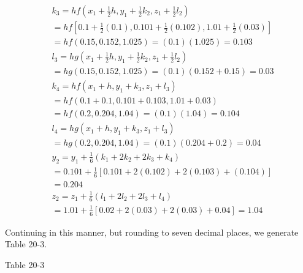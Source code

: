 \documentclass[10pt]{article}
\begin{document}
$$\begin{aligned}
& k_{3}=h f\left(x_{1}+\frac{1}{2} h, y_{1}+\frac{1}{2} k_{2}, z_{1}+\frac{1}{2} l_{2}\right) \\
& =h f\left[0.1+\frac{1}{2}(0.1), 0.101+\frac{1}{2}(0.102), 1.01+\frac{1}{2}(0.03)\right] \\
& =h f(0.15,0.152,1.025)=(0.1)(1.025)=0.103 \\
& l_{3}=h g\left(x_{1}+\frac{1}{2} h, y_{1}+\frac{1}{2} k_{2}, z_{1}+\frac{1}{2} l_{2}\right) \\
& =h g(0.15,0.152,1.025)=(0.1)(0.152+0.15)=0.03 \\
& k_{4}=h f\left(x_{1}+h, y_{1}+k_{3}, z_{1}+l_{3}\right) \\
& =h f(0.1+0.1,0.101+0.103,1.01+0.03) \\
& =h f(0.2,0.204,1.04)=(0.1)(1.04)=0.104 \\
& l_{4}=h g\left(x_{1}+h, y_{1}+k_{3}, z_{1}+l_{3}\right) \\
& =h g(0.2,0.204,1.04)=(0.1)(0.204+0.2)=0.04 \\
& y_{2}=y_{1}+\frac{1}{6}\left(k_{1}+2 k_{2}+2 k_{3}+k_{4}\right) \\
& =0.101+\frac{1}{6}[0.101+2(0.102)+2(0.103)+(0.104)] \\
& =0.204 \\
& z_{2}=z_{1}+\frac{1}{6}\left(l_{1}+2 l_{2}+2 l_{3}+l_{4}\right) \\
& =1.01+\frac{1}{6}[0.02+2(0.03)+2(0.03)+0.04]=1.04
\end{aligned}
$$

Continuing in this manner, but rounding to seven decimal places, we generate Table 20-3.

Table 20-3
\end{document}

